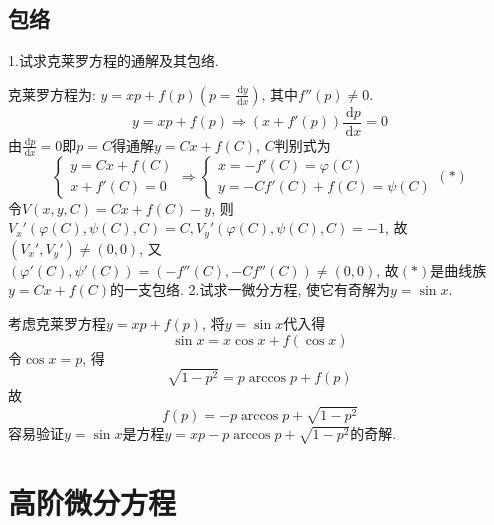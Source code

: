 \documentclass[titlepage,11pt,a4paper,twoside]{report}
\makeatletter
\newcommand\diff{\,\mathrm{d}}
\newenvironment{solve}{\par
	\pushQED{\qed}%
	\normalfont \topsep1\p@\@plus6\p@\relax
	\trivlist
	\item\relax
	{\hspace*{\parindent}{\heiti 解}\@addpunct{:}}\hspace\labelsep\ignorespaces
}{%
	\popQED\endtrivlist\@endpefalse
}
\makeatother
\begin{document}
\section{包络}
1.试求克莱罗方程的通解及其包络.
\begin{solve} 
克莱罗方程为: $y=xp+f(p)\left(p=\frac{\diff y}{\diff x}\right)$, 其中$f''(p)\neq0$.\\
\[y=xp+f(p)\Rightarrow(x+f'(p))\frac{\diff p}{\diff x}=0\]
由$\frac{\diff p}{\diff x}=0$即$p=C$得通解$y=Cx+f(C)$, $C$判别式为
\[\begin{cases}
y=Cx+f(C)\\x+f'(C)=0
\end{cases}\Rightarrow
\begin{cases}
x=-f'(C)=\varphi(C)\\
y=-Cf'(C)+f(C)=\psi(C)
\end{cases}(*)\]
令$V(x,y,C)=Cx+f(C)-y$, 则$V_x'(\varphi(C),\psi(C),C)=C,V_y'(\varphi(C),\psi(C),C)=-1$, 故$(V_x',V_y')\neq(0,0)$, 又$(\varphi'(C),\psi'(C))=(-f''(C),-Cf''(C))\neq(0,0)$, 故$(*)$是曲线族$y=Cx+f(C)$的一支包络.
\end{solve}
2.试求一微分方程, 使它有奇解为$y=\sin x$.
\begin{solve} 
考虑克莱罗方程$y=xp+f(p)$, 将$y=\sin x$代入得
\[\sin x=x\cos x+f(\cos x)\]
令$\cos x=p$, 得
\[\sqrt{1-p^2}=p\arccos p+f(p)\]
故\[f(p)=-p\arccos p+\sqrt{1-p^2}\]
容易验证$y=\sin x$是方程$y=xp-p\arccos p+\sqrt{1-p^2}$的奇解.
\end{solve}
\chapter{高阶微分方程}
\end{document}
